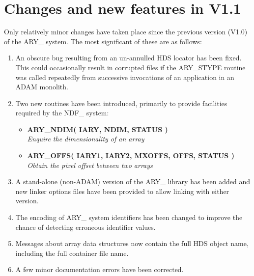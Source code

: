 \documentclass[twoside,11pt]{article}
\newcommand{\xlabel}[1]{}
\newcommand{\noteroutine}[2]{\textbf{#1}\hspace*{\fill}\nopagebreak \\
                             \hspace*{3em}\emph{#2}\hspace*{\fill}\par}
\begin{document}
\newpage
\section{\xlabel{changes_and_new_features_in_v11}%
Changes and new features in V1.1}
\label{changes_and_new_features_in_v11}

Only relatively minor changes have taken place since the previous
version (V1.0) of the ARY\_ system.  The most significant of these are
as follows:

\begin{enumerate}

\item An obscure bug resulting from an un-annulled HDS locator has been
fixed.  This could occasionally result in corrupted files if the
ARY\_STYPE routine was called repeatedly from successive invocations of
an application in an ADAM monolith.

\item Two new routines have been introduced, primarily to provide facilities
required by the NDF\_ system:

\begin{itemize}

\item \noteroutine{ARY\_NDIM( IARY, NDIM, STATUS )}
                  {Enquire the dimensionality of an array}

\item \noteroutine{ARY\_OFFS( IARY1, IARY2, MXOFFS, OFFS, STATUS )}
                  {Obtain the pixel offset between two arrays}

\end{itemize}

\item A stand-alone (non-ADAM) version of the ARY\_ library has been
added and new linker options files have been provided to allow linking
with either version.

\item The encoding of ARY\_ system identifiers has been changed to
improve the chance of detecting erroneous identifier values.

\item Messages about array data structures now contain the full HDS object
name, including the full container file name.

\item A few minor documentation errors have been corrected.

\end{enumerate}
\end{document}

